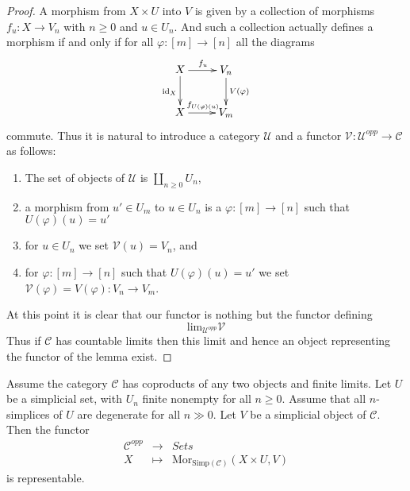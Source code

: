 \begin{proof}
A morphism from $X \times U$ into $V$ is given by a collection
of morphisms $f_u : X \to V_n$ with $n \geq 0$ and $u \in U_n$.
And such a collection actually defines a morphism if and only
if for all $\varphi : [m] \to [n]$ all the diagrams
$$
\xymatrix{
X \ar[r]^{f_u} \ar[d]_{\text{id}_X} & V_n \ar[d]^{V(\varphi)} \\
X \ar[r]^{f_{U(\varphi)(u)}} & V_m
}
$$
commute. Thus it is natural to introduce a category
$\mathcal{U}$ and a functor
$\mathcal{V} : \mathcal{U}^{opp} \to \mathcal{C}$
as follows:
\begin{enumerate}
\item The set of objects of $\mathcal{U}$ is
$\coprod_{n \geq 0} U_n$,
\item a morphism from $u' \in U_m$ to $u \in U_n$
is a $\varphi : [m] \to [n]$ such that $U(\varphi)(u) = u'$
\item for $u \in U_n$ we set $\mathcal{V}(u) = V_n$, and
\item for $\varphi : [m] \to [n]$ such that $U(\varphi)(u) = u'$
we set $\mathcal{V}(\varphi) = V(\varphi) : V_n \to V_m$.
\end{enumerate}
At this point it is clear that our functor is nothing but the
functor defining
$$
\text{lim}_{\mathcal{U}^{opp}} \mathcal{V}
$$
Thus if $\mathcal{C}$ has countable limits then this limit
and hence an object representing the functor of the lemma
exist.
\end{proof}

\begin{lemma}
\label{lemma-exists-hom-0-from-simplicial-set-finite}
Assume the category $\mathcal{C}$
has coproducts of any two objects and finite
limits. Let $U$ be a simplicial set, with $U_n$ finite nonempty
for all $n \geq 0$. Assume that all $n$-simplices
of $U$ are degenerate for all $n \gg 0$.
Let $V$ be a simplicial object of $\mathcal{C}$.
Then the functor
\begin{eqnarray*}
\mathcal{C}^{opp} & \longrightarrow & \textit{Sets} \\
X
& \longmapsto &
\text{Mor}_{\text{Simp}(\mathcal{C})}(X \times U, V)
\end{eqnarray*}
is representable.
\end{lemma}

